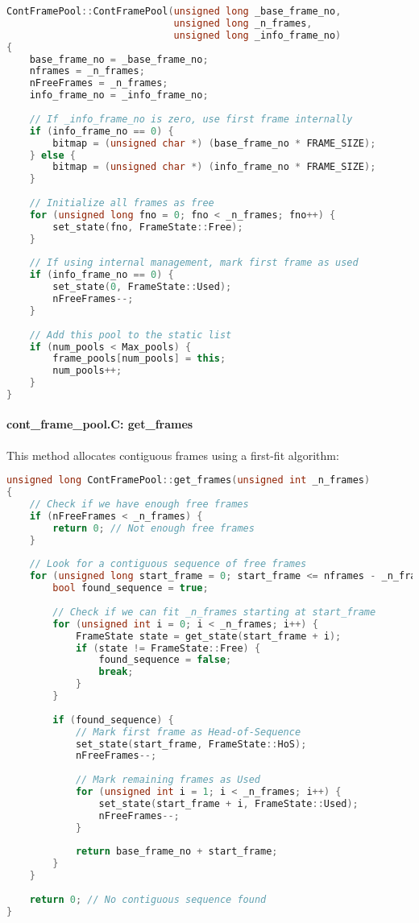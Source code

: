 \documentclass{article}
\begin{document}
\begin{lstlisting}[language=C++, caption=Frame Pool Constructor]
ContFramePool::ContFramePool(unsigned long _base_frame_no,
                             unsigned long _n_frames,
                             unsigned long _info_frame_no)
{
    base_frame_no = _base_frame_no;
    nframes = _n_frames;
    nFreeFrames = _n_frames;
    info_frame_no = _info_frame_no;
    
    // If _info_frame_no is zero, use first frame internally
    if (info_frame_no == 0) {
        bitmap = (unsigned char *) (base_frame_no * FRAME_SIZE);
    } else {
        bitmap = (unsigned char *) (info_frame_no * FRAME_SIZE);
    }
    
    // Initialize all frames as free
    for (unsigned long fno = 0; fno < _n_frames; fno++) {
        set_state(fno, FrameState::Free);
    }
    
    // If using internal management, mark first frame as used
    if (info_frame_no == 0) {
        set_state(0, FrameState::Used);
        nFreeFrames--;
    }
    
    // Add this pool to the static list
    if (num_pools < Max_pools) {
        frame_pools[num_pools] = this;
        num_pools++;
    }
}
\end{lstlisting}

\paragraph{cont\_frame\_pool.C: get\_frames} This method allocates contiguous frames using a first-fit algorithm:

\begin{lstlisting}[language=C++, caption=Frame Allocation Method]
unsigned long ContFramePool::get_frames(unsigned int _n_frames)
{
    // Check if we have enough free frames
    if (nFreeFrames < _n_frames) {
        return 0; // Not enough free frames
    }
    
    // Look for a contiguous sequence of free frames
    for (unsigned long start_frame = 0; start_frame <= nframes - _n_frames; start_frame++) {
        bool found_sequence = true;
        
        // Check if we can fit _n_frames starting at start_frame
        for (unsigned int i = 0; i < _n_frames; i++) {
            FrameState state = get_state(start_frame + i);
            if (state != FrameState::Free) {
                found_sequence = false;
                break;
            }
        }
        
        if (found_sequence) {
            // Mark first frame as Head-of-Sequence
            set_state(start_frame, FrameState::HoS);
            nFreeFrames--;
            
            // Mark remaining frames as Used
            for (unsigned int i = 1; i < _n_frames; i++) {
                set_state(start_frame + i, FrameState::Used);
                nFreeFrames--;
            }
            
            return base_frame_no + start_frame;
        }
    }
    
    return 0; // No contiguous sequence found
}
\end{lstlisting}
\end{document}
